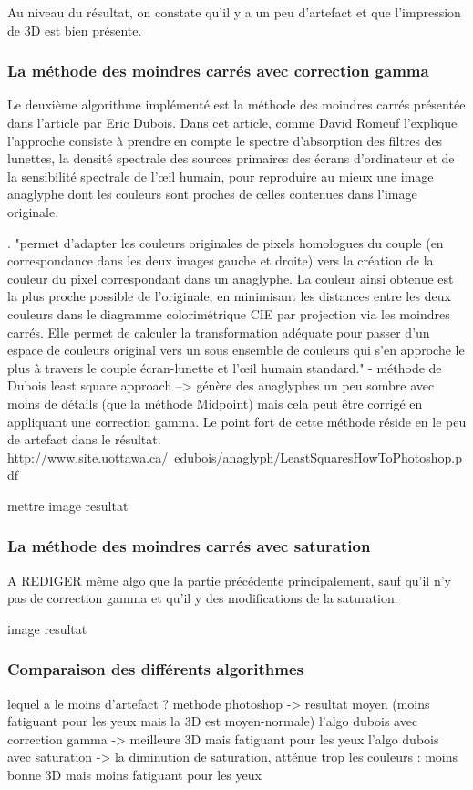 	Au niveau du résultat, on constate qu'il y a un peu d'artefact et que l'impression de 3D est bien présente.
\subsubsection{La méthode des moindres carrés avec correction gamma}
	Le deuxième algorithme implémenté est la méthode des moindres carrés présentée dans l'article \cite{algoDubois} par Eric Dubois. Dans cet article, comme David Romeuf l'explique \cite{explicationAlgoDubois} l'approche consiste à prendre en compte le spectre d'absorption des filtres des lunettes, la densité spectrale des sources primaires des écrans d'ordinateur et de la sensibilité spectrale de l'œil humain, pour reproduire au mieux une image anaglyphe dont les couleurs sont proches de celles contenues dans l'image originale. 
	
	
	
	
	\cite{algoMoindreCarres}. 
	"permet d'adapter les couleurs originales de pixels homologues du couple (en correspondance dans les deux images gauche et droite) vers la création de la couleur du pixel correspondant dans un anaglyphe. La couleur ainsi obtenue est la plus proche possible de l'originale, en minimisant les distances entre les deux couleurs dans le diagramme colorimétrique CIE par projection via les moindres carrés. Elle permet de calculer la transformation adéquate pour passer d'un espace de couleurs original vers un sous ensemble de couleurs qui s'en approche le plus à travers le couple écran-lunette et l'œil humain standard."
- méthode de Dubois least square approach
--> génère des anaglyphes un peu sombre avec moins de détails (que la méthode Midpoint) mais cela peut être corrigé en appliquant une correction gamma. Le point fort de cette méthode réside en le peu de artefact dans le résultat.
http://www.site.uottawa.ca/~edubois/anaglyph/LeastSquaresHowToPhotoshop.pdf

mettre image resultat

\subsubsection{La méthode des moindres carrés avec saturation}
A REDIGER
même algo que la partie précédente principalement, sauf qu'il n'y pas de correction gamma et qu'il y des modifications de la saturation.

image resultat

\subsubsection{Comparaison des différents algorithmes}

lequel a le moins d'artefact ?
methode photoshop -> resultat moyen (moins fatiguant pour les yeux mais la 3D est moyen-normale)
l'algo dubois avec correction gamma -> meilleure 3D mais fatiguant pour les yeux
l'algo dubois avec saturation -> la diminution de saturation, atténue trop les couleurs : moins bonne 3D mais moins fatiguant pour les yeux 




